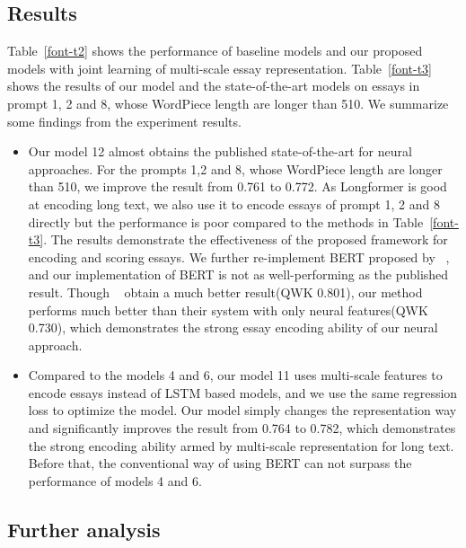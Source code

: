 \documentclass[11pt]{article}
\begin{document}
\subsection{Results}





Table~\ref{font-t2} shows the performance of baseline models and our proposed models with joint learning of multi-scale essay representation. Table~\ref{font-t3} shows the results of our model and the state-of-the-art models on essays in prompt 1, 2 and 8, whose WordPiece length are longer than 510.
We summarize some findings from the experiment results.

\begin{itemize}
\item Our model 12 almost obtains the published state-of-the-art for neural approaches.
For the prompts 1,2 and 8, whose WordPiece length are longer than 510, we improve the result from 0.761 to 0.772. As Longformer is good at encoding long text, we also use it to encode essays of prompt 1, 2 and 8 directly but the performance is poor compared to the methods in Table~\ref{font-t3}. 
The results demonstrate the effectiveness of the proposed framework for encoding and scoring essays. We further re-implement BERT proposed by ~\citep{Yang:2020}, and our implementation of BERT is not as well-performing as the published result. Though ~\citep{Uto:2020} obtain a much better result(QWK 0.801), our method performs much better than their system with only neural features(QWK 0.730), which demonstrates the strong essay encoding ability of our neural approach.

\item Compared to the models 4 and 6, our model 11 uses multi-scale features to encode essays instead of LSTM based models, and we use the same regression loss to optimize the model.
Our model simply changes the representation way and significantly improves the result from 0.764 to 0.782, which demonstrates the strong encoding ability armed by multi-scale representation for long text. Before that, the conventional way of using BERT can not surpass the performance of models 4 and 6. 



\end{itemize}


\subsection{Further analysis}
\end{document}
